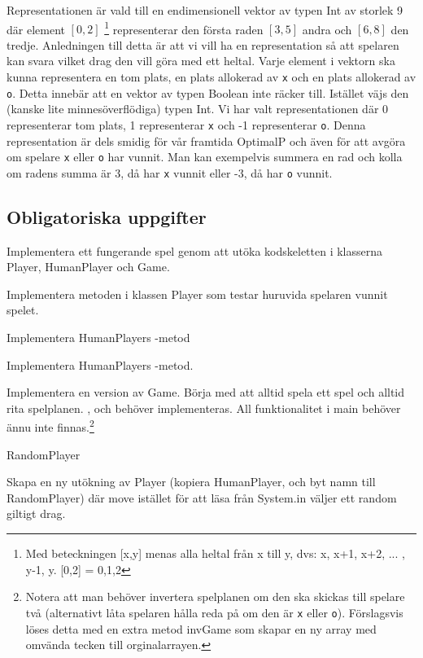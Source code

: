 Representationen är vald till en endimensionell vektor av typen Int av storlek 9 där element $[0,2]$ \footnote{Med beteckningen [x,y] menas alla heltal från x till y, dvs: x, x+1, x+2, ... , y-1, y. [0,2] = {0,1,2}} representerar den första raden $[3,5]$ andra och $[6,8]$ den tredje. Anledningen till detta är att vi vill ha en representation så att spelaren kan svara vilket drag den vill göra med ett heltal.
Varje element i vektorn ska kunna representera en tom plats, en plats allokerad av \texttt{x} och en plats allokerad av \texttt{o}. Detta innebär att en vektor av typen Boolean inte räcker till. Istället väjs den (kanske lite minnesöverflödiga) typen Int. Vi har valt representationen där 0 representerar tom plats, 1 representerar \texttt{x} och -1 representerar \texttt{o}. Denna representation är dels smidig för vår framtida OptimalP och även för att avgöra om spelare \texttt{x} eller \texttt{o} har vunnit. Man kan exempelvis summera en rad och kolla om radens summa är 3, då har \texttt{x} vunnit eller -3, då har \texttt{o} vunnit.
 
\subsection{Obligatoriska uppgifter}

\Task Implementera ett fungerande spel genom att utöka kodskeletten i klasserna Player, HumanPlayer och Game.

\Subtask Implementera metoden  i klassen Player som testar huruvida spelaren  vunnit spelet.

\Subtask Implementera HumanPlayers -metod

\Subtask Implementera HumanPlayers -metod.

\Subtask Implementera en version av Game. Börja med att alltid spela ett spel och alltid rita spelplanen. ,  och  behöver implementeras. All funktionalitet i main behöver ännu inte finnas.\footnote{Notera att man behöver invertera spelplanen om den ska skickas till spelare två (alternativt låta spelaren hålla reda på om den är \texttt{x} eller \texttt{o}). Förslagsvis löses detta med en extra metod invGame som skapar en ny array med omvända tecken till orginalarrayen.}

\Task RandomPlayer

\Subtask Skapa en ny utökning av Player (kopiera HumanPlayer, och byt namn till RandomPlayer) där move istället för att läsa från System.in väljer ett random giltigt drag.

